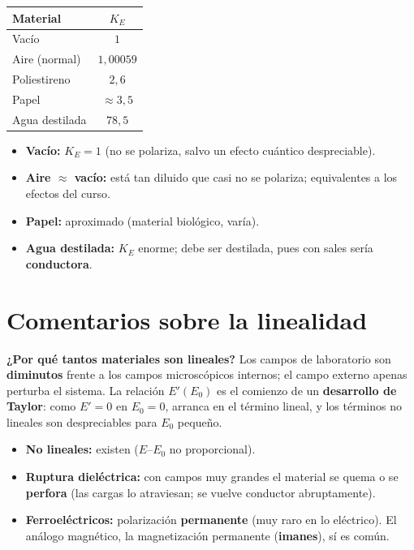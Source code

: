 \documentclass[12pt,a4paper]{article}
\begin{document}
\begin{center}
\begin{tabular}{lc}
\toprule
\textbf{Material} & $K_E$ \\
\midrule
Vacío & $1$ \\
Aire (normal) & $1{,}00059$ \\
Poliestireno & $2{,}6$ \\
Papel & $\approx 3{,}5$ \\
Agua destilada & $78{,}5$ \\
\bottomrule
\end{tabular}
\end{center}

\begin{itemize}[nosep]
  \item \textbf{Vacío:} $K_E=1$ (no se polariza, salvo un efecto cuántico
        despreciable).
  \item \textbf{Aire $\approx$ vacío:} está tan diluido que casi no se
        polariza; equivalentes a los efectos del curso.
  \item \textbf{Papel:} aproximado (material biológico, varía).
  \item \textbf{Agua destilada:} $K_E$ enorme; debe ser destilada, pues
        con sales sería \textbf{conductora}.
\end{itemize}

\section{Comentarios sobre la linealidad}

\textbf{¿Por qué tantos materiales son lineales?} Los campos de
laboratorio son \textbf{diminutos} frente a los campos microscópicos
internos; el campo externo apenas perturba el sistema. La relación
$E'(E_0)$ es el comienzo de un \textbf{desarrollo de Taylor}: como
$E'=0$ en $E_0=0$, arranca en el término lineal, y los términos no
lineales son despreciables para $E_0$ pequeño.

\begin{itemize}[nosep]
  \item \textbf{No lineales:} existen ($E$--$E_0$ no proporcional).
  \item \textbf{Ruptura dieléctrica:} con campos muy grandes el material
        se quema o se \textbf{perfora} (las cargas lo atraviesan; se
        vuelve conductor abruptamente).
  \item \textbf{Ferroeléctricos:} polarización \textbf{permanente} (muy
        raro en lo eléctrico). El análogo magnético, la magnetización
        permanente (\textbf{imanes}), sí es común.
\end{itemize}
\end{document}
